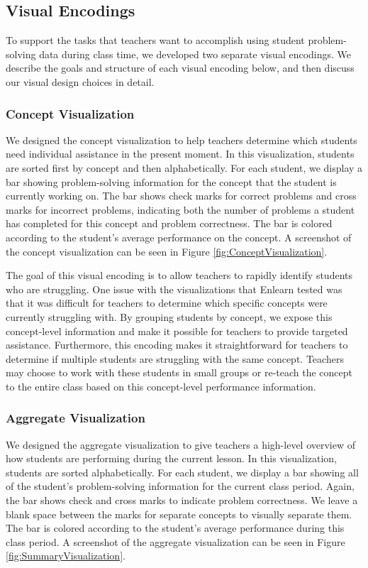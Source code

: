 \documentclass{sigchi}
\begin{document}
\subsection{Visual Encodings}
To support the tasks that teachers want to accomplish using student problem-solving data during class time, we developed two separate visual encodings. We describe the goals and structure of each visual encoding below, and then discuss our visual design choices in detail.

\subsubsection{Concept Visualization}
We designed the concept visualization to help teachers determine which students need individual assistance in the present moment. In this visualization, students are sorted first by concept and then alphabetically. For each student, we display a bar showing problem-solving information for the concept that the student is currently working on. The bar shows check marks for correct problems and cross marks for incorrect problems, indicating both the number of problems a student has completed for this concept and problem correctness. The bar is colored according to the student's average performance on the concept. A screenshot of the concept visualization can be seen in Figure \ref{fig:ConceptVisualization}.

The goal of this visual encoding is to allow teachers to rapidly identify students who are struggling. One issue with the visualizations that Enlearn tested was that it was difficult for teachers to determine which specific concepts were currently struggling with. By grouping students by concept, we expose this concept-level information and make it possible for teachers to provide targeted assistance. Furthermore, this encoding makes it straightforward for teachers to determine if multiple students are struggling with the same concept. Teachers may choose to work with these students in small groups or re-teach the concept to the entire class based on this concept-level performance information.

\subsubsection{Aggregate Visualization}
We designed the aggregate visualization to give teachers a high-level overview of how students are performing during the current lesson. In this visualization, students are sorted alphabetically. For each student, we display a bar showing all of the student's problem-solving information for the current class period. Again, the bar shows check and cross marks to indicate problem correctness. We leave a blank space between the marks for separate concepts to visually separate them. The bar is colored according to the student's average performance during this class period. A screenshot of the aggregate visualization can be seen in Figure \ref{fig:SummaryVisualization}.
\end{document}

